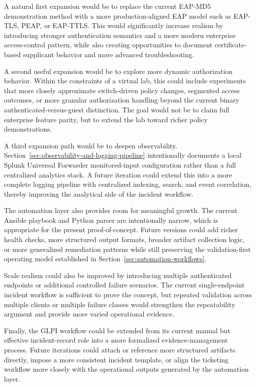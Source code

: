 \documentclass[11pt]{article}
\begin{document}
A natural first expansion would be to replace the current EAP-MD5 demonstration method with a more production-aligned EAP model such as EAP-TLS, PEAP, or EAP-TTLS. This would significantly increase realism by introducing stronger authentication semantics and a more modern enterprise access-control pattern, while also creating opportunities to document certificate-based supplicant behavior and more advanced troubleshooting.

A second useful expansion would be to explore more dynamic authorization behavior. Within the constraints of a virtual lab, this could include experiments that more closely approximate switch-driven policy changes, segmented access outcomes, or more granular authorization handling beyond the current binary authenticated-versus-guest distinction. The goal would not be to claim full enterprise feature parity, but to extend the lab toward richer policy demonstrations.

A third expansion path would be to deepen observability. Section~\ref{sec:observability-and-logging-pipeline} intentionally documents a local Splunk Universal Forwarder monitored-input configuration rather than a full centralized analytics stack. A future iteration could extend this into a more complete logging pipeline with centralized indexing, search, and event correlation, thereby improving the analytical side of the incident workflow.

The automation layer also provides room for meaningful growth. The current Ansible playbook and Python parser are intentionally narrow, which is appropriate for the present proof-of-concept. Future versions could add richer health checks, more structured output formats, broader artifact collection logic, or more generalized remediation patterns while still preserving the validation-first operating model established in Section~\ref{sec:automation-workflows}.

Scale realism could also be improved by introducing multiple authenticated endpoints or additional controlled failure scenarios. The current single-endpoint incident workflow is sufficient to prove the concept, but repeated validation across multiple clients or multiple failure classes would strengthen the repeatability argument and provide more varied operational evidence.

Finally, the GLPI workflow could be extended from its current manual but effective incident-record role into a more formalized evidence-management process. Future iterations could attach or reference more structured artifacts directly, impose a more consistent incident template, or align the ticketing workflow more closely with the operational outputs generated by the automation layer.
\end{document}
